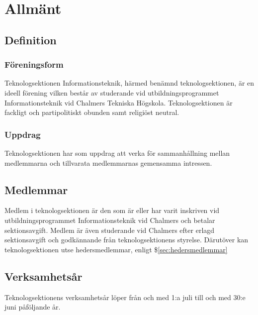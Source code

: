\section{Allmänt}

\subsection{Definition}

\subsubsection{Föreningsform}
Teknologsektionen Informationsteknik, härmed benämnd teknologsektionen, är en ideell förening vilken består av studerande vid utbildningsprogrammet Informationsteknik vid Chalmers Tekniska Högskola. Teknologsektionen är fackligt och partipolitiskt obunden samt religiöst neutral.

\subsubsection{Uppdrag}
Teknologsektionen har som uppdrag att verka för sammanhållning mellan medlemmarna och tillvarata medlemmarnas gemensamma intressen.

\subsection{Medlemmar}

Medlem i teknologsektionen är den som är eller har varit inskriven vid utbildningsprogrammet Informationsteknik vid Chalmers och betalar sektionsavgift. Medlem är även studerande vid Chalmers efter erlagd sektionsavgift och godkännande från teknologsektionens styrelse. Därutöver kan teknologsektionen utse hedersmedlemmar, enligt \$\ref{sec:hedersmedlemmar}

\subsection{Verksamhetsår}
Teknologsektionens verksamhetsår löper från och med 1:a juli till och med 30:e juni påföljande år.